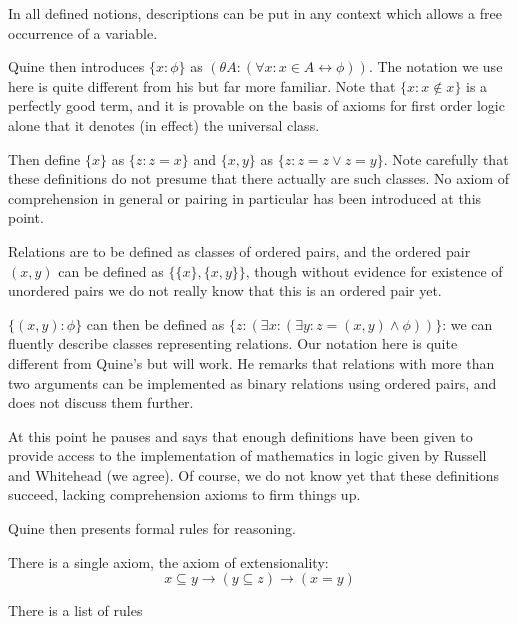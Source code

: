 \documentclass[12pt]{article}
\begin{document}
In all defined notions, descriptions can be put in any context which allows a free occurrence of a variable.

Quine then introduces $\{x:\phi\}$ as $(\theta A:(\forall x:x \in A \leftrightarrow \phi))$.  The notation we use here is quite different from his but far more familiar.  Note that $\{x:x \not\in x\}$ is a perfectly good term, and it is provable on the basis of axioms for first order logic alone that it denotes (in effect) the universal class.

Then define $\{x\}$ as $\{z:z=x\}$ and $\{x,y\}$ as $\{z:z=z\vee z=y\}$.  Note carefully that these definitions do not presume that there actually are such classes.  No axiom of comprehension in general or pairing in particular has been introduced at this point.

Relations are to be defined as classes of ordered pairs, and the ordered pair $(x,y)$ can be defined as $\{\{x\},\{x,y\}\}$, though without evidence for existence of unordered pairs we do not really know that this is an ordered pair yet.

$\{(x,y):\phi\}$ can then be defined as $\{z:(\exists x:(\exists y:z=(x,y) \wedge \phi))\}$:  we can fluently describe classes representing relations.   Our notation here is quite different from Quine's but will work.  He remarks that relations with more than two arguments can be implemented as binary relations using ordered pairs, and does not discuss them further.

At this point he pauses and says that enough definitions have been given to provide access to the implementation of mathematics in logic given by Russell and Whitehead (we agree).  Of course, we do not know yet that these definitions succeed, lacking comprehension axioms to firm things up.

Quine then presents formal rules for reasoning.

There is a single axiom, the axiom of extensionality: $$x \subseteq y \rightarrow (y \subseteq z) \rightarrow (x=y)$$

There is a list of rules
\end{document}
